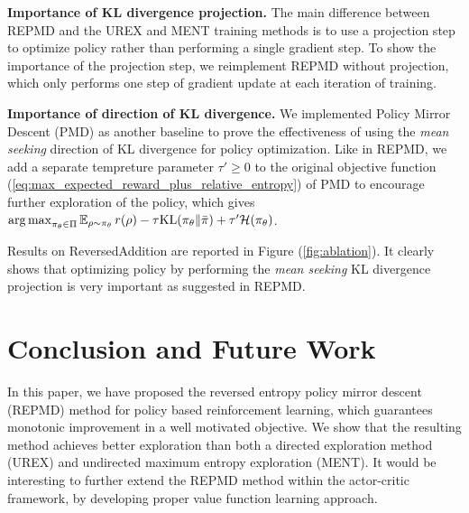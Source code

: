 \textbf{Importance of KL divergence projection.} The main difference between REPMD and the UREX and MENT training methods is to use a projection step to optimize policy rather than performing a single gradient step. To show the importance of the projection step, we reimplement REPMD without projection, which only performs one step of gradient update at each iteration of training. 

\textbf{Importance of direction of KL divergence.} We implemented Policy Mirror Descent (PMD) as another baseline to prove the effectiveness of using the \emph{mean seeking} direction of KL divergence for policy optimization. Like in REPMD, we add a separate tempreture parameter $\tau'\geq 0$ to the original objective function (\ref{eq:max_expected_reward_plus_relative_entropy}) of PMD to encourage further exploration of the policy, which gives $\operatorname*{arg\,max}_{\pi_\theta \in \Pi}{ \operatorname*{\mathbb{E}}_{\rho \sim \pi_\theta}{  r(\rho)  - \tau \text{KL}(\pi_\theta \| \bar{\pi}) } + \tau'\mathcal{H}(\pi_\theta) }$.

Results on ReversedAddition are reported in Figure (\ref{fig:ablation}). It clearly shows that optimizing policy by performing the \emph{mean seeking} KL divergence projection is very important as suggested in REPMD. 


\section{Conclusion and Future Work}
\label{sec:conclusion_and_future_work}

In this paper, we have proposed the reversed entropy policy mirror descent (REPMD) method for policy based reinforcement learning, which guarantees monotonic improvement in a well motivated objective. We show that the resulting method achieves better exploration than both a directed exploration method (UREX) and undirected maximum entropy exploration (MENT). It would be interesting to further extend the REPMD method within the actor-critic framework, by developing proper value function learning approach. %

